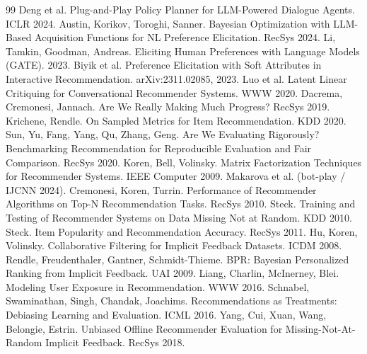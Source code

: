 \documentclass[11pt]{article}
\begin{document}
\begin{thebibliography}{99}
 Deng et al. Plug-and-Play Policy Planner for LLM-Powered Dialogue Agents. ICLR 2024.
 Austin, Korikov, Toroghi, Sanner. Bayesian Optimization with LLM-Based Acquisition Functions for NL Preference Elicitation. RecSys 2024.
 Li, Tamkin, Goodman, Andreas. Eliciting Human Preferences with Language Models (GATE). 2023.
 Biyik et al. Preference Elicitation with Soft Attributes in Interactive Recommendation. arXiv:2311.02085, 2023.
 Luo et al. Latent Linear Critiquing for Conversational Recommender Systems. WWW 2020.
 Dacrema, Cremonesi, Jannach. Are We Really Making Much Progress? RecSys 2019.
 Krichene, Rendle. On Sampled Metrics for Item Recommendation. KDD 2020.
 Sun, Yu, Fang, Yang, Qu, Zhang, Geng. Are We Evaluating Rigorously? Benchmarking Recommendation for Reproducible Evaluation and Fair Comparison. RecSys 2020.
 Koren, Bell, Volinsky. Matrix Factorization Techniques for Recommender Systems. IEEE Computer 2009.
 Makarova et al. (bot-play / IJCNN 2024).
 Cremonesi, Koren, Turrin. Performance of Recommender Algorithms on Top-N Recommendation Tasks. RecSys 2010.
 Steck. Training and Testing of Recommender Systems on Data Missing Not at Random. KDD 2010.
 Steck. Item Popularity and Recommendation Accuracy. RecSys 2011.
 Hu, Koren, Volinsky. Collaborative Filtering for Implicit Feedback Datasets. ICDM 2008.
 Rendle, Freudenthaler, Gantner, Schmidt-Thieme. BPR: Bayesian Personalized Ranking from Implicit Feedback. UAI 2009.
 Liang, Charlin, McInerney, Blei. Modeling User Exposure in Recommendation. WWW 2016.
 Schnabel, Swaminathan, Singh, Chandak, Joachims. Recommendations as Treatments: Debiasing Learning and Evaluation. ICML 2016.
 Yang, Cui, Xuan, Wang, Belongie, Estrin. Unbiased Offline Recommender Evaluation for Missing-Not-At-Random Implicit Feedback. RecSys 2018.
\end{thebibliography}
\end{document}
